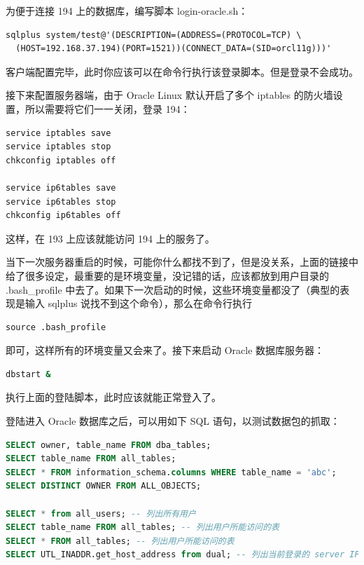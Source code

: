 为便于连接 194 上的数据库，编写脚本 {\ff login-oracle.sh}：

\begin{lstlisting}
sqlplus system/test@'(DESCRIPTION=(ADDRESS=(PROTOCOL=TCP) \
  (HOST=192.168.37.194)(PORT=1521))(CONNECT_DATA=(SID=orcl11g)))'
\end{lstlisting}

客户端配置完毕，此时你应该可以在命令行执行该登录脚本。但是登录不会成功。

接下来配置服务器端，由于 Oracle Linux 默认开启了多个 iptables 的防火墙设置，所以需要将它们一一关闭，登录 194：

\begin{lstlisting}
service iptables save
service iptables stop
chkconfig iptables off

service ip6tables save
service ip6tables stop
chkconfig ip6tables off
\end{lstlisting}

这样，在 193 上应该就能访问 194 上的服务了。

当下一次服务器重启的时候，可能你什么都找不到了，但是没关系，上面的链接中给了很多设定，最重要的是环境变量，没记错的话，应该都放到用户目录的 {\ff .bash\_profile} 中去了。如果下一次启动的时候，这些环境变量都没了（典型的表现是输入 {\cmdf sqlplus} 说找不到这个命令），那么在命令行执行

\begin{lstlisting}
source .bash_profile
\end{lstlisting}

即可，这样所有的环境变量又会来了。接下来启动 Oracle 数据库服务器：

\begin{lstlisting}[language=sh]
dbstart &
\end{lstlisting}

执行上面的登陆脚本，此时应该就能正常登入了。

登陆进入 Oracle 数据库之后，可以用如下 SQL 语句，以测试数据包的抓取：

\begin{lstlisting}[language=sql]
SELECT owner, table_name FROM dba_tables;
SELECT table_name FROM all_tables;
SELECT * FROM information_schema.columns WHERE table_name = 'abc';
SELECT DISTINCT OWNER FROM ALL_OBJECTS;

SELECT * from all_users; -- 列出所有用户
SELECT table_name FROM all_tables; -- 列出用户所能访问的表
SELECT * FROM all_tables; -- 列出用户所能访问的表
SELECT UTL_INADDR.get_host_address from dual; -- 列出当前登录的 server IP
\end{lstlisting}

